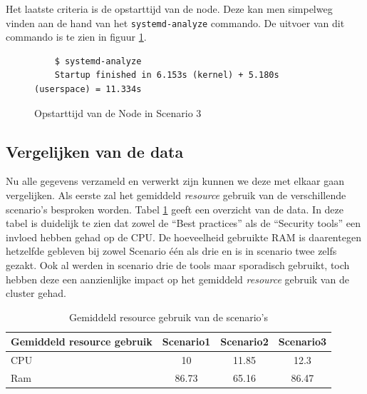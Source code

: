 Het laatste criteria is de opstarttijd van de node. Deze kan men simpelweg vinden aan de hand van het \verb|systemd-analyze| commando. De uitvoer van dit commando is te zien in figuur \ref{SC3_StartTime}.

\begin{figure}[h]
	\centering
	\begin{verbatim} 
	$ systemd-analyze
	Startup finished in 6.153s (kernel) + 5.180s (userspace) = 11.334s
	\end{verbatim}
	\caption{Opstarttijd van de Node in Scenario 3}
	\label{SC3_StartTime}
\end{figure}

\clearpage
\subsection{Vergelijken van de data}
Nu alle gegevens verzameld en verwerkt zijn kunnen we deze met elkaar gaan vergelijken. Als eerste zal het gemiddeld \textit{resource} gebruik van de verschillende scenario's besproken worden. Tabel \ref{tab:AVGResource} geeft een overzicht van de data. In deze tabel is duidelijk te zien dat zowel de ``Best practices'' als de ``Security tools'' een invloed hebben gehad op de CPU. De hoeveelheid gebruikte RAM is daarentegen hetzelfde gebleven bij zowel Scenario één als drie en is in scenario twee zelfs gezakt. Ook al werden in scenario drie de tools maar sporadisch gebruikt, toch hebben deze een aanzienlijke impact op het gemiddeld \textit{resource} gebruik van de cluster gehad. 
\begin{table}[h]
	\centering
	\begin{tabular}{lccc}
		Gemiddeld resource gebruik & Scenario1 & Scenario2 & Scenario3 \\ \hline
		CPU                        & 10        & 11.85        & 12.3      \\ \hline
		Ram                        & 86.73     & 65.16        & 86.47    
	\end{tabular}
	\caption{Gemiddeld resource gebruik van de scenario's}
	\label{tab:AVGResource}
\end{table}

